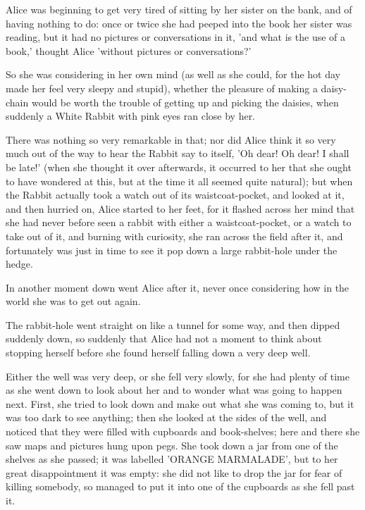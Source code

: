 \documentclass[landscape]{book}
\begin{document}
Alice was beginning to get very tired of sitting by her sister on the bank, and of having nothing to do: once or twice she had peeped into the book her sister was reading, but it had no pictures or conversations in it, 'and what is the use of a book,' thought Alice 'without pictures or conversations?'

So she was considering in her own mind (as well as she could, for the hot day made her feel very sleepy and stupid), whether the pleasure of making a daisy-chain would be worth the trouble of getting up and picking the daisies, when suddenly a White Rabbit with pink eyes ran close by her.

There was nothing so very remarkable in that; nor did Alice think it so very much out of the way to hear the Rabbit say to itself, 'Oh dear! Oh dear! I shall be late!' (when she thought it over afterwards, it occurred to her that she ought to have wondered at this, but at the time it all seemed quite natural); but when the Rabbit actually took a watch out of its waistcoat-pocket, and looked at it, and then hurried on, Alice started to her feet, for it flashed across her mind that she had never before seen a rabbit with either a waistcoat-pocket, or a watch to take out of it, and burning with curiosity, she ran across the field after it, and fortunately was just in time to see it pop down a large rabbit-hole under the hedge.

In another moment down went Alice after it, never once considering how in the world she was to get out again.

The rabbit-hole went straight on like a tunnel for some way, and then dipped suddenly down, so suddenly that Alice had not a moment to think about stopping herself before she found herself falling down a very deep well.

Either the well was very deep, or she fell very slowly, for she had plenty of time as she went down to look about her and to wonder what was going to happen next. First, she tried to look down and make out what she was coming to, but it was too dark to see anything; then she looked at the sides of the well, and noticed that they were filled with cupboards and book-shelves; here and there she saw maps and pictures hung upon pegs. She took down a jar from one of the shelves as she passed; it was labelled 'ORANGE MARMALADE', but to her great disappointment it was empty: she did not like to drop the jar for fear of killing somebody, so managed to put it into one of the cupboards as she fell past it.
\end{document}
